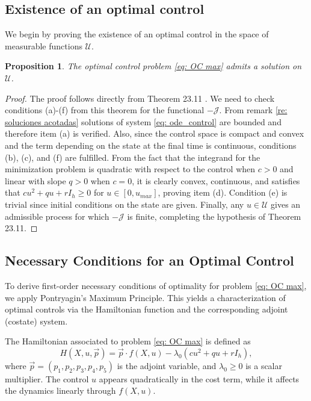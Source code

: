 \documentclass{amsart}
\newtheorem{prop}[thm]{Proposition}
\theoremstyle{definition}
\theoremstyle{remark}
\numberwithin{equation}{section}
\begin{document}
\subsection{Existence of an optimal control}
We begin by proving the existence of an optimal control in the space of measurable functions $\mathcal U$. 
\begin{prop}
	\label{pr: exist_optimo} The optimal control problem \eqref{eq: OC max} admits a solution on $\mathcal{U}$.
\end{prop}
\begin{proof}
	The proof follows directly from Theorem 23.11 \cite{Clarke2013}.
	We need to check conditions (a)-(f) from this theorem for the functional $-\mathcal{J}$.
	From remark \ref{re: soluciones acotadas} solutions of system \eqref{eq: ode_control} are bounded and therefore item (a) is verified.
	Also, since the control space is compact and convex and the term depending on the state at the final time is continuous, conditions (b), (c), and (f) are fulfilled. 
	From the fact that the integrand for the minimization problem is quadratic with respect to the control when $c>0$ and linear with slope $q> 0$ when $c=0$, it is clearly convex, continuous, and satisfies that 
    $c u^2 + q u+rI_h \ge 0$ for $u\in[0,u_{max}]$, proving item (d). Condition (e) is trivial since initial conditions on the state are given.
	Finally, any $u \in {\mathcal U}$ 
	gives an admissible process for which $-\mathcal{J}$ is finite, completing the hypothesis of Theorem
	23.11.
\end{proof}	

\subsection{Necessary Conditions for an Optimal Control}
\label{sec: necessary conditions}


To derive first-order necessary conditions of optimality for problem \eqref{eq: OC max}, we apply Pontryagin's Maximum Principle. This yields a characterization of optimal controls via the Hamiltonian function and the corresponding adjoint (costate) system.

The Hamiltonian associated to problem \eqref{eq: OC max} is defined as
\begin{equation}\label{HamiltonianM1}
	H(X,u,\vec{p}) = \vec{p} \cdot f(X,u) - \lambda_0 (c u^2 + q u+rI_h),
\end{equation}
where $\vec{p} = (p_1, p_2, p_3, p_4, p_5)$ is the adjoint variable, and $\lambda_0 \geq 0$ is a scalar multiplier. The control $u$ appears quadratically in the cost term, while it affects the dynamics linearly through $f(X,u)$.
\end{document}
